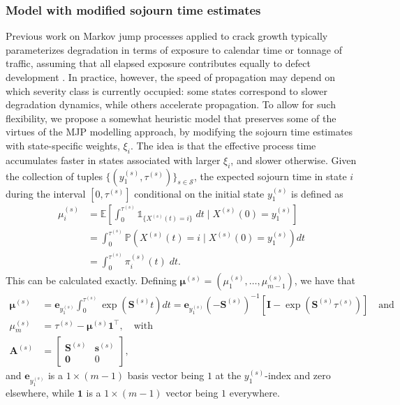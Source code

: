 \subsubsection{Model with modified sojourn time estimates} \label{sec:warping}
Previous work on Markov jump processes applied to crack growth typically parameterizes degradation in terms of exposure to calendar time or tonnage of traffic, assuming that all elapsed exposure contributes equally to defect development \citep{bisgaard2024A}. 
In practice, however, the speed of propagation may depend on which severity class is currently occupied: some states correspond to slower degradation dynamics, while others accelerate propagation.
To allow for such flexibility, we propose a somewhat heuristic model that preserves some of the virtues of the MJP modelling approach, by modifying the sojourn time estimates with state-specific weights, $\xi_i$.
The idea is that the effective process time accumulates faster in states associated with larger $\xi_i$, and slower otherwise.
Given the collection of tuples $\{ ( y_1^{(s)}, \tau^{(s)} ) \}_{s \in \mathcal{S}}$, the expected sojourn time in state $i$ during the interval $\left[ 0,\tau^{(s)} \right]$ conditional on the initial state $y_1^{(s)}$ is defined as
\begin{equation*}
    \begin{aligned}
    \mu_i^{(s)} &=\mathbb{E} \left[ \left. \int_0^{\tau^{(s)}} \mathds{1}_{\{X^{(s)}(t) = i\}} \; dt \; \Big| \; X^{(s)}(0) = y_1^{(s)} \right. \right] \\ 
				&= \int_0^{\tau^{(s)}}\mathds{P}\left(X^{(s)}(t)=i \; \Big| \; X^{(s)}(0)=y_1^{(s)}\right)dt \\ 
				&= \int_0^{\tau^{(s)}} \pi^{(s)}_i(t) \; dt.
\end{aligned}  \label{eq:cumulative_sojourn_time}
\end{equation*} 
This can be calculated exactly. Defining $\bm{\mu}^{(s)}  =  \left(\mu_1^{(s)},\dots,\mu_{m-1}^{(s)}\right)$, we have that
\begin{equation}
    \begin{aligned}
\bm{\mu}^{(s)} &= \bm{e}_{y_{1}^{(s)}} \int_0^{\tau^{(s)}}\exp\left(\bm{S}^{(s)}t\right) dt = \bm{e}_{y_{1}^{(s)}} (-\bm{S}^{(s)})^{-1}\left[\bm{I} - \exp \left( \bm{S}^{(s)}\tau^{(s)} \right) \right] \quad \text{and} \\ 
\mu_m^{(s)}  &= \tau^{(s)} - \bm{\mu}^{(s)}\bm{1}^\top, \quad \text{with} \\
\bm{A}^{(s)} &= \left[\begin{array}{cc} \bm{S}^{(s)} & \bm{s}^{(s)}\\
\bm{0} & 0\end{array}\right], 
    \end{aligned} \label{eq:sojourn_time_estimate}
\end{equation}
and $\bm{e}_{y_{1}^{(s)}}$ is a $1 \times (m-1)$ basis vector being $1$ at the $y_{1}^{(s)}$-index and zero elsewhere, while $\bm{1}$ is a $1 \times (m-1)$ vector being $1$ everywhere.

